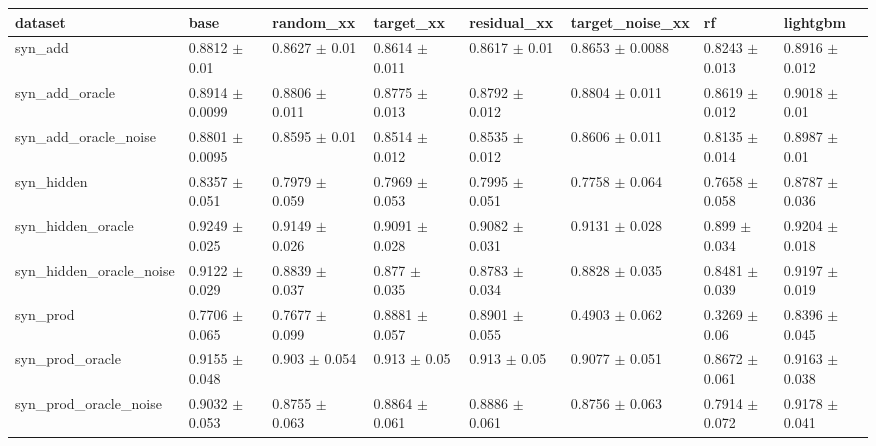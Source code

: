 \begin{tabular}{llllllll}
\toprule
dataset & base & random\_xx & target\_xx & residual\_xx & target\_noise\_xx & rf & lightgbm \\
\midrule
syn\_add & 0.8812 $\pm$ 0.01 & 0.8627 $\pm$ 0.01 & 0.8614 $\pm$ 0.011 & 0.8617 $\pm$ 0.01 & 0.8653 $\pm$ 0.0088 & 0.8243 $\pm$ 0.013 & 0.8916 $\pm$ 0.012 \\
syn\_add\_oracle & 0.8914 $\pm$ 0.0099 & 0.8806 $\pm$ 0.011 & 0.8775 $\pm$ 0.013 & 0.8792 $\pm$ 0.012 & 0.8804 $\pm$ 0.011 & 0.8619 $\pm$ 0.012 & 0.9018 $\pm$ 0.01 \\
syn\_add\_oracle\_noise & 0.8801 $\pm$ 0.0095 & 0.8595 $\pm$ 0.01 & 0.8514 $\pm$ 0.012 & 0.8535 $\pm$ 0.012 & 0.8606 $\pm$ 0.011 & 0.8135 $\pm$ 0.014 & 0.8987 $\pm$ 0.01 \\
syn\_hidden & 0.8357 $\pm$ 0.051 & 0.7979 $\pm$ 0.059 & 0.7969 $\pm$ 0.053 & 0.7995 $\pm$ 0.051 & 0.7758 $\pm$ 0.064 & 0.7658 $\pm$ 0.058 & 0.8787 $\pm$ 0.036 \\
syn\_hidden\_oracle & 0.9249 $\pm$ 0.025 & 0.9149 $\pm$ 0.026 & 0.9091 $\pm$ 0.028 & 0.9082 $\pm$ 0.031 & 0.9131 $\pm$ 0.028 & 0.899 $\pm$ 0.034 & 0.9204 $\pm$ 0.018 \\
syn\_hidden\_oracle\_noise & 0.9122 $\pm$ 0.029 & 0.8839 $\pm$ 0.037 & 0.877 $\pm$ 0.035 & 0.8783 $\pm$ 0.034 & 0.8828 $\pm$ 0.035 & 0.8481 $\pm$ 0.039 & 0.9197 $\pm$ 0.019 \\
syn\_prod & 0.7706 $\pm$ 0.065 & 0.7677 $\pm$ 0.099 & 0.8881 $\pm$ 0.057 & 0.8901 $\pm$ 0.055 & 0.4903 $\pm$ 0.062 & 0.3269 $\pm$ 0.06 & 0.8396 $\pm$ 0.045 \\
syn\_prod\_oracle & 0.9155 $\pm$ 0.048 & 0.903 $\pm$ 0.054 & 0.913 $\pm$ 0.05 & 0.913 $\pm$ 0.05 & 0.9077 $\pm$ 0.051 & 0.8672 $\pm$ 0.061 & 0.9163 $\pm$ 0.038 \\
syn\_prod\_oracle\_noise & 0.9032 $\pm$ 0.053 & 0.8755 $\pm$ 0.063 & 0.8864 $\pm$ 0.061 & 0.8886 $\pm$ 0.061 & 0.8756 $\pm$ 0.063 & 0.7914 $\pm$ 0.072 & 0.9178 $\pm$ 0.041 \\
\bottomrule
\end{tabular}
